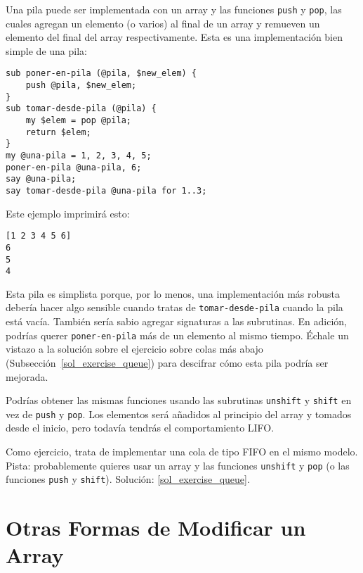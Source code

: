 Una pila puede ser implementada con un array y las funciones
{\tt push} y {\tt pop}, las cuales agregan un elemento (o varios)
al final de un array y remueven un elemento del final del array 
respectivamente. Esta es una implementación bien simple de una pila:
\label{stack_code}

\begin{lstlisting}
sub poner-en-pila (@pila, $new_elem) {
	push @pila, $new_elem;
}
sub tomar-desde-pila (@pila) {
    my $elem = pop @pila;
    return $elem;
}
my @una-pila = 1, 2, 3, 4, 5;
poner-en-pila @una-pila, 6;
say @una-pila;
say tomar-desde-pila @una-pila for 1..3;
\end{lstlisting}

Este ejemplo imprimirá esto:

\begin{lstlisting}
[1 2 3 4 5 6]
6
5
4
\end{lstlisting}

Esta pila es simplista porque, por lo menos, una implementación
más robusta debería hacer algo sensible cuando tratas de 
{\tt tomar-desde-pila} cuando la pila está vacía. También sería
sabio agregar signaturas a las subrutinas. En adición, podrías querer
{\tt poner-en-pila} más de un elemento al mismo tiempo. Échale un
vistazo a la solución sobre el ejercicio sobre colas más abajo
(Subsección~\ref{sol_exercise_queue}) para descifrar cómo esta pila
podría ser mejorada.

Podrías obtener las mismas funciones usando las subrutinas
{\tt unshift} y {\tt shift} en vez de {\tt push} y {\tt pop}.
Los elementos será añadidos al principio del array y tomados
desde el inicio, pero todavía tendrás el comportamiento LIFO.

\label{exercise_queue}
Como ejercicio, trata de implementar una cola de tipo FIFO en el
mismo modelo. Pista: probablemente quieres usar un array y las
funciones {\tt unshift} y {\tt pop} (o las funciones 
{\tt push} y {\tt shift}). Solución: \ref{sol_exercise_queue}.

\section{Otras Formas de Modificar un Array}
\label{modify_array}

